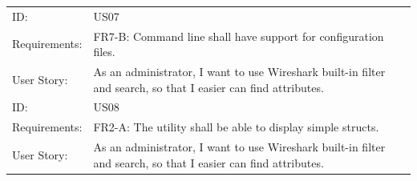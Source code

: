 \begin{table}[htbp]
{\begin{tabularx}{1.2\textwidth}{l X}
	\midrule
	ID:			& US07 \\
	Requirements:	&  FR7-B: Command line shall have support for configuration files. \\
	User Story:		&  As an administrator, I want to use Wireshark built-in filter and search, so that I easier can find attributes. \\
	\midrule
	ID:			& US08 \\
	Requirements:	&  FR2-A: The utility shall be able to display simple structs. \\
	User Story:		&  As an administrator, I want to use Wireshark built-in filter and search, so that I easier can find attributes. \\
	\bottomrule
\end{tabularx}}
\end{table}

